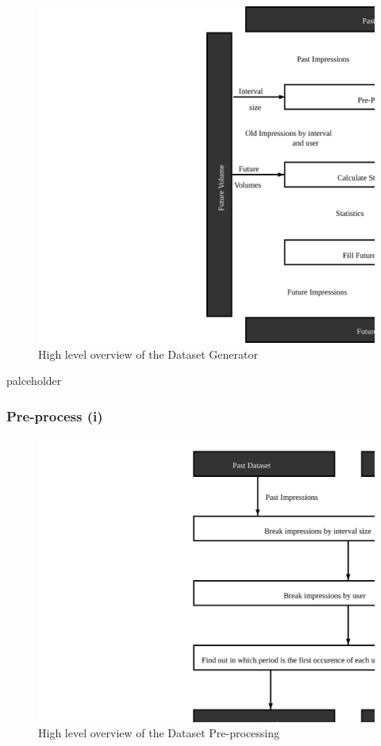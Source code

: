 \begin{figure}[h] \begin{center} \leavevmode
\includegraphics[]{high_level_file_gen} \caption{ High level overview
of the Dataset Generator } \label{fig:highlevel_arch_file_gen} \end{center} \end{figure}

palceholder

\subsubsection{Pre-process (i)}

\begin{figure}[h] \begin{center} \leavevmode
\includegraphics[]{pre_processing_i} \caption{ High level overview
of the Dataset Pre-processing} \label{fig:pre_processing_i} \end{center} \end{figure}

